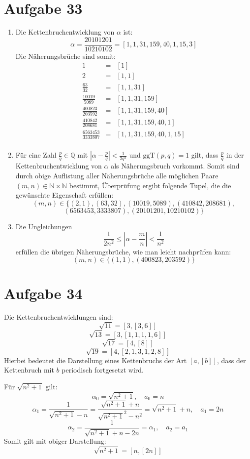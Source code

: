 \section*{Aufgabe 33}
\begin{enumerate}[(1)]
	\item Die Kettenbruchentwicklung von $\alpha$ ist:
	\[ \alpha = \frac{20101201}{10210102} = [ 1, 1, 31, 159, 40, 1, 15, 3 ] \]
	Die Näherungsbrüche sind somit:
	\begin{eqnarray*}
	1 &=& [1] \\
	2 &=& [1, 1] \\
	\frac{63}{32} &=& [1,1,31] \\
	\frac{10019 }{5089} &=& [1,1,31,159] \\
	\frac{400823}{203592} &=& [1,1,31,159,40] \\
	\frac{410842}{208681} &=& [1,1,31,159,40,1] \\
	\frac{6563453}{3333807} &=& [1,1,31,159,40,1,15] \\
	\end{eqnarray*}
		
	\item Für eine Zahl $\frac{p}{q} \in \mathbb{Q}$ mit $\left| \alpha -
	\frac{p}{q} \right| < \frac{1}{2 q^2}$ und $\text{ggT}(p,q) = 1$ gilt, dass
	$\frac{p}{q}$ in der Kettenbruchentwicklung von $\alpha$ als
	Näherungsbruch vorkommt.
	Somit sind durch obige Auflistung aller Näherungsbrüche alle möglichen Paare $(m,n) \in \mathbb{N} \times \mathbb{N}$ bestimmt, Überprüfung ergibt folgende Tupel, die die gewünschte Eigenschaft erfüllen:
	\[ (m,n) \in \{ (2,1), (63,32), (10019, 5089), (410842 ,208681 ), \]
	\[ (6563453 ,3333807 ), (20101201 ,10210102 )\} \]

	\item Die Ungleichungen 
	\[ \frac{1}{2 n^2} \leq \left| \alpha - \frac{m}{n} \right| < \frac{1}{n^2} \]
	erfüllen die übrigen Näherungsbrüche, wie man leicht nachprüfen kann:
	\[ (m,n) \in \{(1,1), (400823, 203592)\} \]
\end{enumerate}


\section*{Aufgabe 34}
Die Kettenbruchentwicklungen sind:
\[ \sqrt{11} = [3, [3, 6]] \]
\[ \sqrt{13} = [3, [1, 1, 1, 1, 6]] \]
\[ \sqrt{17} = [4, [8]] \]
\[ \sqrt{19} = [4, [2, 1, 3, 1, 2, 8]] \]
Hierbei bedeutet die Darstellung eines Kettenbruchs der Art $[a, [b]]$, dass
der Kettenbruch mit $b$ periodisch fortgesetzt wird.

Für $\sqrt{n^2 + 1}$ gilt:
\[ \alpha_0 = \sqrt{n^2 + 1}, \quad a_0 = n \]
\[ \alpha_1 = \frac{1}{\sqrt{n^2 + 1} - n} = \frac{\sqrt{n^2 + 1} + n}{{\sqrt{n^2 + 1}}^2 - n^2} = \sqrt{n^2 + 1} + n, \quad a_1 = 2n \]
\[ \alpha_2 = \frac{1}{\sqrt{n^2 + 1} + n - 2n} = \alpha_1, \quad a_2 = a_1 \]
Somit gilt mit obiger Darstellung:
\[ \sqrt{n^2 + 1} = [n, [2n]] \]
